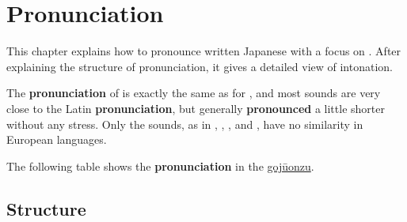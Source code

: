 \chapter{Pronunciation}
\label{chap:Pronunciation}\label{sec:Pronunciation}

This chapter explains how to pronounce written Japanese with a focus on
\jkanavoc. After explaining the structure of pronunciation, it gives a detailed
view of intonation.

The \textbf{pronunciation} of \jkanavoc is exactly the same as for
\hyperref[sec:\jscript]{\jtopic}, and most sounds are very close to the Latin
\textbf{pronunciation}, but generally \textbf{pronounced} a little shorter
without any stress. Only the  sounds, as in , ,
,  and , have no similarity in European languages.



The following table shows the \textbf{pronunciation} in the
\hyperref[sec:Gojuonzu]{gojūonzu}.



\section{Structure}

